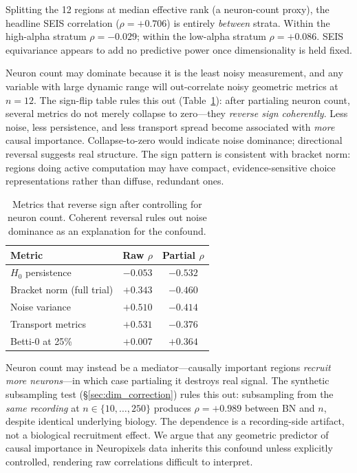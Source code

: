 \documentclass[9pt,lineno]{elife}
\begin{document}
Splitting the 12 regions at median effective rank (a neuron-count proxy), the headline SEIS correlation ($\rho = +0.706$) is entirely \emph{between} strata. Within the high-alpha stratum $\rho = -0.029$; within the low-alpha stratum $\rho = +0.086$. SEIS equivariance appears to add no predictive power once dimensionality is held fixed.

Neuron count may dominate because it is the least noisy measurement, and any variable with large dynamic range will out-correlate noisy geometric metrics at $n = 12$. The sign-flip table rules this out (Table~\ref{tab:signflip}): after partialing neuron count, several metrics do not merely collapse to zero---they \emph{reverse sign coherently}. Less noise, less persistence, and less transport spread become associated with \emph{more} causal importance. Collapse-to-zero would indicate noise dominance; directional reversal suggests real structure. The sign pattern is consistent with bracket norm: regions doing active computation may have compact, evidence-sensitive choice representations rather than diffuse, redundant ones.

\begin{table}[t]
\centering
\caption{Metrics that reverse sign after controlling for neuron count. Coherent reversal rules out noise dominance as an explanation for the confound.}
\label{tab:signflip}
\begin{tabular}{lcc}
\toprule
Metric & Raw $\rho$ & Partial $\rho$ \\
\midrule
$H_0$ persistence & $-0.053$ & $-0.532$ \\
Bracket norm (full trial) & $+0.343$ & $-0.460$ \\
Noise variance & $+0.510$ & $-0.414$ \\
Transport metrics & $+0.531$ & $-0.376$ \\
Betti-0 at 25\% & $+0.007$ & $+0.364$ \\
\bottomrule
\end{tabular}
\end{table}

Neuron count may instead be a mediator---causally important regions \emph{recruit more neurons}---in which case partialing it destroys real signal. The synthetic subsampling test (\S\ref{sec:dim_correction}) rules this out: subsampling from the \emph{same recording} at $n \in \{10, \ldots, 250\}$ produces $\rho = +0.989$ between BN and $n$, despite identical underlying biology. The dependence is a recording-side artifact, not a biological recruitment effect. We argue that any geometric predictor of causal importance in Neuropixels data inherits this confound unless explicitly controlled, rendering raw correlations difficult to interpret.
\end{document}
